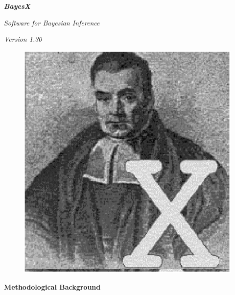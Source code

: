 \documentclass[11pt,a4paper,twoside]{bayesxarticle}
\begin{document}
\MakeShortVerb{\#}

\thispagestyle{empty}

\begin{center}
{\bf \em \huge Bayes{\Huge X}}

\vspace{0.5cm}

{\em \large Software for Bayesian Inference}

\vspace{0.5cm}

{\em Version 1.30}

\vspace{0.5cm}

\begin{figure}[h]
\begin{center}
\includegraphics[scale=1.2]{grafiken/bayesicon.eps}
\end{center}
\end{figure}

\vfill

{\bf\sffamily \huge Methodological Background}

\vfill

\end{center}
\end{document}
